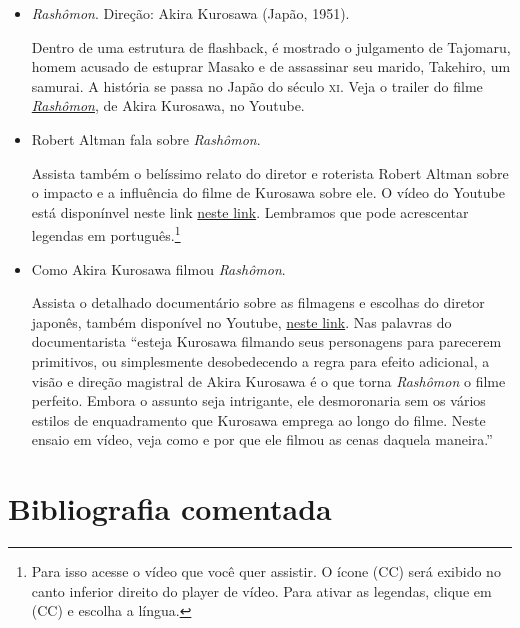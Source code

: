 \documentclass[12pt]{extarticle}
\begin{document}
\begin{itemize} 

\item\emph{Rashômon}. Direção: Akira Kurosawa (Japão, 1951).

Dentro de uma estrutura de flashback, é mostrado o julgamento de Tajomaru,
homem acusado de estuprar Masako e de assassinar seu marido, Takehiro, um
samurai. A história se passa no Japão do século \textsc{xi}. Veja o trailer 
do filme \href{https://www.youtube.com/watch?v=WKd4tIHB064}{\emph{Rashômon}}, 
de Akira Kurosawa, no Youtube.

\item Robert Altman fala sobre \emph{Rashômon}.

Assista também o belíssimo relato do diretor e roterista Robert Altman 
sobre o impacto e a influência do filme de Kurosawa sobre ele. 
O vídeo do Youtube está disponínvel neste link
\href{https://www.youtube.com/watch?v=oYWQa0GExt8}{neste link}. 
Lembramos que pode acrescentar legendas em 
português.\footnote{Para isso acesse o vídeo que você quer assistir.
O ícone (CC) será exibido no canto inferior direito do player de vídeo.
Para ativar as legendas, clique em (CC) e escolha a língua.}

\item Como Akira Kurosawa filmou \emph{Rashômon}. 

Assista o detalhado documentário sobre as filmagens e escolhas do 
diretor japonês, também disponível no Youtube, 
\href{https://www.youtube.com/watch?v=-tkDU0_r8dU}{neste link}.
Nas palavras do documentarista ``esteja Kurosawa 
filmando seus personagens para parecerem primitivos, 
ou simplesmente desobedecendo a regra para efeito adicional, 
a visão e direção magistral de Akira Kurosawa é o que torna \emph{Rashômon} 
o filme perfeito. Embora o assunto seja intrigante, ele desmoronaria 
sem os vários estilos de enquadramento que Kurosawa emprega ao longo 
do filme. Neste ensaio em vídeo, veja como e por que ele filmou 
as cenas daquela maneira.''
\end{itemize}

\section{Bibliografia comentada}
\end{document}
